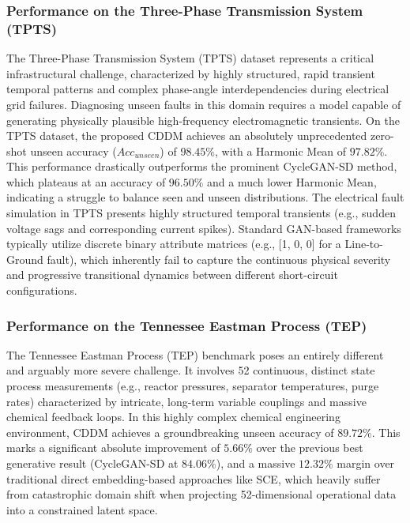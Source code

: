\subsubsection{Performance on the Three-Phase Transmission System (TPTS)}
The Three-Phase Transmission System (TPTS) dataset represents a critical infrastructural challenge, characterized by highly structured, rapid transient temporal patterns and complex phase-angle interdependencies during electrical grid failures. Diagnosing unseen faults in this domain requires a model capable of generating physically plausible high-frequency electromagnetic transients. On the TPTS dataset, the proposed CDDM achieves an absolutely unprecedented zero-shot unseen accuracy ($Acc_{unseen}$) of $98.45\%$, with a Harmonic Mean of $97.82\%$. This performance drastically outperforms the prominent CycleGAN-SD method, which plateaus at an accuracy of $96.50\%$ and a much lower Harmonic Mean, indicating a struggle to balance seen and unseen distributions. The electrical fault simulation in TPTS presents highly structured temporal transients (e.g., sudden voltage sags and corresponding current spikes). Standard GAN-based frameworks typically utilize discrete binary attribute matrices (e.g., [1, 0, 0] for a Line-to-Ground fault), which inherently fail to capture the continuous physical severity and progressive transitional dynamics between different short-circuit configurations. 

\subsubsection{Performance on the Tennessee Eastman Process (TEP)}
The Tennessee Eastman Process (TEP) benchmark poses an entirely different and arguably more severe challenge. It involves 52 continuous, distinct state process measurements (e.g., reactor pressures, separator temperatures, purge rates) characterized by intricate, long-term variable couplings and massive chemical feedback loops. In this highly complex chemical engineering environment, CDDM achieves a groundbreaking unseen accuracy of $89.72\%$. This marks a significant absolute improvement of $5.66\%$ over the previous best generative result (CycleGAN-SD at $84.06\%$), and a massive $12.32\%$ margin over traditional direct embedding-based approaches like SCE, which heavily suffer from catastrophic domain shift when projecting 52-dimensional operational data into a constrained latent space.

